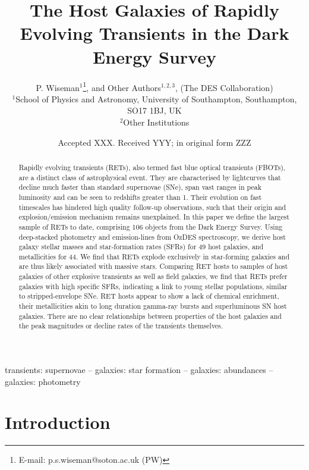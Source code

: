 \documentclass[fleqn,usenatbib,]{mnras}
\title[RET host galaxies in DES]{The Host Galaxies of Rapidly Evolving Transients in the Dark Energy Survey}
\author[P. Wiseman et al.]{
P. Wiseman$^1$\thanks{E-mail: p.s.wiseman@soton.ac.uk (PW)},
 and Other Authors$^{1,2,3}$,
\newauthor
(The DES Collaboration)
\\
$^{1}$School of Physics and Astronomy, University of Southampton, Southampton, SO17 1BJ, UK\\
$^{2}$Other Institutions\\
}
\date{Accepted XXX. Received YYY; in original form ZZZ}
\begin{document}
\label{firstpage}
\pagerange{\pageref{firstpage}--\pageref{lastpage}}
\maketitle

\begin{abstract}
Rapidly evolving transients (RETs), also termed fast blue optical transients (FBOTs), are a distinct class of astrophysical event. They are characterised by lightcurves that decline much faster than standard supernovae (SNe), span vast ranges in peak luminosity and can be seen to redshifts greater than 1. Their evolution on fast timescales has hindered high quality follow-up observations, such that their origin and explosion/emission mechanism remains unexplained. In this paper we define the largest sample of RETs to date, comprising 106 objects from the Dark Energy Survey. Using deep-stacked photometry and emission-lines from OzDES spectroscopy, we derive host galaxy stellar masses and star-formation rates (SFRs) for 49 host galaxies, and metallicities for 44. We find that RETs explode exclusively in star-forming galaxies and are thus likely associated with massive stars. Comparing RET hosts to samples of host galaxies of other explosive transients as well as field galaxies, we find that RETs prefer galaxies with high specific SFRs, indicating a link to young stellar populations, similar to stripped-envelope SNe. RET hosts appear to show a lack of chemical enrichment, their metallicities akin to long duration gamma-ray bursts and superluminous SN host galaxies. There are no clear relationships between properties of the host galaxies and the peak magnitudes or decline rates of the transients themselves.

\end{abstract}

\begin{keywords}
transients: supernovae -- galaxies: star formation -- galaxies: abundances -- galaxies: photometry 
\end{keywords}



\section{Introduction}
\end{document}
